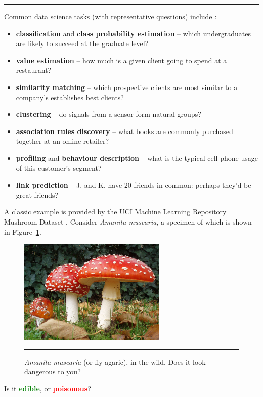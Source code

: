 \begin{center}
    \rule{0.5\textwidth}{.4pt}
\end{center}
Common data science tasks (with representative questions) include \cite{DSML_PF}:
\begin{itemize}[noitemsep]
\item \textbf{classification} and \textbf{class probability estimation} -- 
which undergraduates are likely to succeed at the graduate level?
\item \textbf{value estimation} -- how much is a given client going to spend at a restaurant?
\item \textbf{similarity matching} -- which prospective clients are most similar to a company's establishes best clients?
\item \textbf{clustering} -- do signals from a sensor form natural groups?
\item \textbf{association rules discovery} -- what books are commonly purchased together at an online retailer?
\item \textbf{profiling} and \textbf{behaviour description} -- what is the typical cell phone usage of this customer's segment?
\item \textbf{link prediction} -- J. and K. have 20 friends in common: perhaps they'd be great friends?
\end{itemize}
A classic example is provided by the UCI Machine Learning Repository  Mushroom Dataset \cite{DSML_UCI}. Consider \textit{Amanita muscaria}, a specimen of which is shown in Figure~\ref{fig:DSML_am}.
\begin{figure}[!t]
\centering\includegraphics[width=200pt]{images/DSML/Amanita_muscaria.png}\caption[\small \textit{Amanita muscaria}]{\small \textit{Amanita muscaria} (or fly agaric), in the wild. Does it look dangerous to you?}\label{fig:DSML_am}\hrule
\end{figure}\afterpage{\FloatBarrier}
Is it \textbf{\textcolor{Green}{edible}}, or \textbf{\textcolor{Red}{poisonous}}? 
